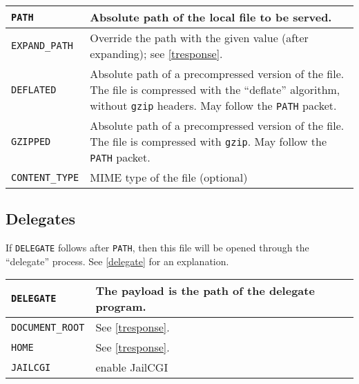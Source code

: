 \documentclass[a4paper,12pt]{article}
\begin{document}
\begin{longtable}{|l|p{8cm}|}
\hline

\verb|PATH| & Absolute path of the local file to be served. \\

\hline

\verb|EXPAND_PATH| & Override the path with the given value (after
expanding); see \ref{tresponse}. \\

\hline

\verb|DEFLATED| & Absolute path of a precompressed version of the
file.  The file is compressed with the ``deflate'' algorithm, without
\texttt{gzip} headers.  May follow the \verb|PATH| packet. \\

\hline

\verb|GZIPPED| & Absolute path of a precompressed version of the
file.  The file is compressed with \texttt{gzip}.  May follow the
\verb|PATH| packet. \\

\hline

\verb|CONTENT_TYPE| & MIME type of the file (optional) \\

\hline
\end{longtable}

\subsection{Delegates}
\label{tdelegate}

If \verb|DELEGATE| follows after \verb|PATH|, then this file will be
opened through the ``delegate'' process.  See \ref{delegate} for an
explanation.

\begin{longtable}{|l|p{8cm}|}
\hline

\verb|DELEGATE| & The payload is the path of the delegate program. \\

\hline

\verb|DOCUMENT_ROOT| & See \ref{tresponse}. \\

\hline

\verb|HOME| & See \ref{tresponse}. \\

\hline

\verb|JAILCGI| & enable JailCGI \\

\hline
\end{longtable}
\end{document}
